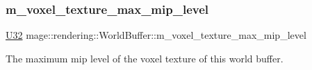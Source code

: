 \subsubsection{\texorpdfstring{m\+\_\+voxel\+\_\+texture\+\_\+max\+\_\+mip\+\_\+level}{m\_voxel\_texture\_max\_mip\_level}}
{\footnotesize\ttfamily \mbox{\hyperlink{namespacemage_aa5d6eaabaac3cdd01873d6a3d27e90f3}{U32}} mage\+::rendering\+::\+World\+Buffer\+::m\+\_\+voxel\+\_\+texture\+\_\+max\+\_\+mip\+\_\+level}

The maximum mip level of the voxel texture of this world buffer. 